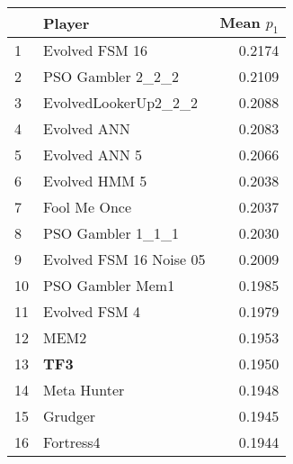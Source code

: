 \begin{tabular}{llr}
\toprule
{} &                   Player &  Mean $p_1$ \\
\midrule
1  &           Evolved FSM 16 &      0.2174 \\
2  &        PSO Gambler 2\_2\_2 &      0.2109 \\
3  &     EvolvedLookerUp2\_2\_2 &      0.2088 \\
4  &              Evolved ANN &      0.2083 \\
5  &            Evolved ANN 5 &      0.2066 \\
6  &            Evolved HMM 5 &      0.2038 \\
7  &             Fool Me Once &      0.2037 \\
8  &        PSO Gambler 1\_1\_1 &      0.2030 \\
9  &  Evolved FSM 16 Noise 05 &      0.2009 \\
10 &         PSO Gambler Mem1 &      0.1985 \\
11 &            Evolved FSM 4 &      0.1979 \\
12 &                     MEM2 &      0.1953 \\
13 &                      \textbf{TF3} &      0.1950 \\
14 &              Meta Hunter &      0.1948 \\
15 &                  Grudger &      0.1945 \\
16 &                Fortress4 &      0.1944 \\
\bottomrule
\end{tabular}
